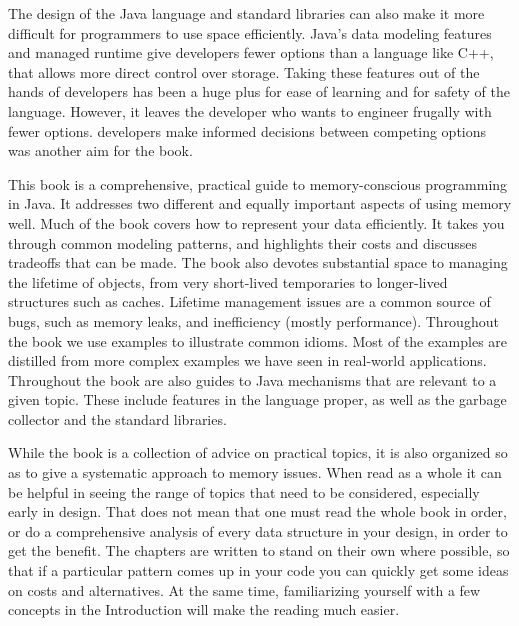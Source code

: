 The design of the Java language and standard libraries can also make it more
difficult for programmers to use space efficiently.  Java's data modeling
features and managed runtime give developers fewer options than a language like
C++, that allows more direct control over storage. Taking these features out of
the hands of developers has been a huge plus for ease of learning and for safety
of the language. However, it leaves the developer who wants to engineer frugally
with fewer options. %
developers make informed decisions between competing options was another aim for
the book.





This book is a comprehensive, practical guide to memory-conscious programming in
Java. It addresses two different and equally important aspects of using memory
well. Much of the book covers how to represent your data efficiently. It takes
you through common modeling patterns, and highlights their costs and discusses
tradeoffs that can be made. The book also devotes substantial space to managing
the lifetime of objects, from very short-lived temporaries to longer-lived
structures such as caches. Lifetime management issues are a common source of
bugs, such as memory leaks, and inefficiency (mostly performance).  Throughout
the book we use examples to illustrate common idioms. Most of the examples are
distilled from more complex examples we have seen in real-world applications. 
Throughout the book are also guides to Java mechanisms that are relevant to a
given topic.  These include features in the language proper, as well as the
garbage collector and the standard libraries.

While the book is a collection of advice on practical topics, it is also
organized so as to give a systematic approach to memory issues. When read as a
whole it can be helpful in seeing the range of topics that need to be
considered, especially early in design. That does not mean that one must read
the whole book in order, or do a comprehensive analysis of every data structure
in your design, in order to get the benefit. The chapters are written to stand
on their own where possible, so that if a particular pattern comes up in your
code you can quickly get some ideas on costs and alternatives. At the same time,
familiarizing yourself with a few concepts in the Introduction will make the
reading much easier.



